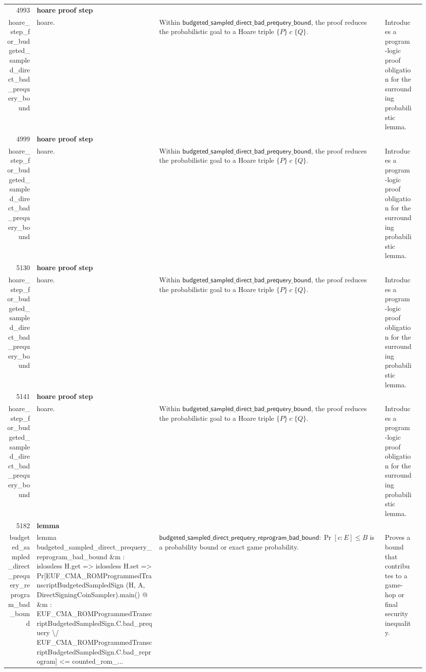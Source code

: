 \documentclass[10pt]{article}
\newcommand{\ec}[1]{\begingroup\ttfamily\scriptsize #1\endgroup}
\begin{document}
\begin{longtable}{r L{0.17\textwidth} L{0.26\textwidth} L{0.27\textwidth} L{0.20\textwidth}}
4993 & \textbf{hoare proof step}\\\ec{hoare\_step\_for\_budgeted\_sampled\_direct\_bad\_prequery\_bound} & \ec{hoare.} & Within \(\mathsf{budgeted\_sampled\_direct\_bad\_prequery\_bound}\), the proof reduces the probabilistic goal to a Hoare triple \(\{P\}\;c\;\{Q\}\). & Introduces a program-logic proof obligation for the surrounding probabilistic lemma. \\
4999 & \textbf{hoare proof step}\\\ec{hoare\_step\_for\_budgeted\_sampled\_direct\_bad\_prequery\_bound} & \ec{hoare.} & Within \(\mathsf{budgeted\_sampled\_direct\_bad\_prequery\_bound}\), the proof reduces the probabilistic goal to a Hoare triple \(\{P\}\;c\;\{Q\}\). & Introduces a program-logic proof obligation for the surrounding probabilistic lemma. \\
5130 & \textbf{hoare proof step}\\\ec{hoare\_step\_for\_budgeted\_sampled\_direct\_bad\_prequery\_bound} & \ec{hoare.} & Within \(\mathsf{budgeted\_sampled\_direct\_bad\_prequery\_bound}\), the proof reduces the probabilistic goal to a Hoare triple \(\{P\}\;c\;\{Q\}\). & Introduces a program-logic proof obligation for the surrounding probabilistic lemma. \\
5141 & \textbf{hoare proof step}\\\ec{hoare\_step\_for\_budgeted\_sampled\_direct\_bad\_prequery\_bound} & \ec{hoare.} & Within \(\mathsf{budgeted\_sampled\_direct\_bad\_prequery\_bound}\), the proof reduces the probabilistic goal to a Hoare triple \(\{P\}\;c\;\{Q\}\). & Introduces a program-logic proof obligation for the surrounding probabilistic lemma. \\
5182 & \textbf{lemma}\\\ec{budgeted\_sampled\_direct\_prequery\_reprogram\_bad\_bound} & \ec{lemma budgeted\_sampled\_direct\_prequery\_reprogram\_bad\_bound \&m : islossless H.get => islossless H.set => Pr[EUF\_CMA\_ROMProgrammedTranscriptBudgetedSampledSign (H, A, DirectSigningCoinSampler).main() @ \&m : EUF\_CMA\_ROMProgrammedTranscriptBudgetedSampledSign.C.bad\_prequery \textbackslash{}/ EUF\_CMA\_ROMProgrammedTranscriptBudgetedSampledSign.C.bad\_reprogram] <= counted\_rom\_...} & \(\mathsf{budgeted\_sampled\_direct\_prequery\_reprogram\_bad\_bound} : \Pr[c : E] \le B\) is a probability bound or exact game probability. & Proves a bound that contributes to a game-hop or final security inequality. \\

\end{longtable}
\end{document}
